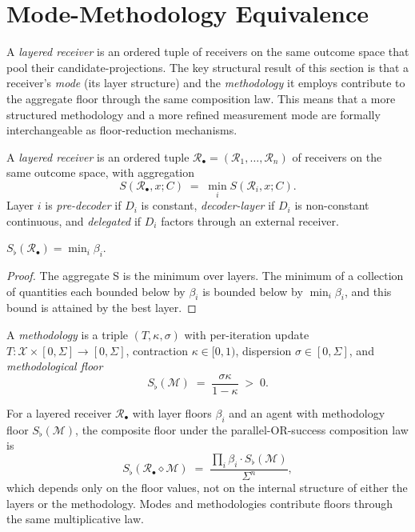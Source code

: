 \section{Mode-Methodology Equivalence}
\label{sec:mode-methodology}

A \emph{layered receiver} is an ordered tuple of receivers on the same
outcome space that pool their candidate-projections.  The key structural
result of this section is that a receiver's \emph{mode} (its layer
structure) and the \emph{methodology} it employs contribute to the
aggregate floor through the same composition law.  This means that a
more structured methodology and a more refined measurement mode are
formally interchangeable as floor-reduction mechanisms.

\begin{definition}
\label{def:layered-receiver}
A \emph{layered receiver} is an ordered tuple
$\mathcal{R}_\bullet = (\mathcal{R}_1, \ldots, \mathcal{R}_n)$ of receivers
on the same outcome space, with aggregation
\[
  S(\mathcal{R}_\bullet, x; C) \;=\; \min_{i} S(\mathcal{R}_i, x; C) .
\]
Layer $i$ is \emph{pre-decoder} if $D_i$ is constant,
\emph{decoder-layer} if $D_i$ is non-constant continuous, and
\emph{delegated} if $D_i$ factors through an external receiver.
\end{definition}

\begin{proposition}
\label{prop:layered-floor}
$S_\flat(\mathcal{R}_\bullet) = \min_i \beta_i$.
\end{proposition}

\begin{proof}
The aggregate S is the minimum over layers.  The minimum of a collection
of quantities each bounded below by $\beta_i$ is bounded below by
$\min_i \beta_i$, and this bound is attained by the best layer.
\end{proof}

\begin{definition}[Methodology]
\label{def:methodology}
A \emph{methodology} is a triple $(T, \kappa, \sigma)$ with per-iteration
update $T : \mathcal{X} \times [0, \Sigma] \to [0, \Sigma]$, contraction
$\kappa \in [0, 1)$, dispersion $\sigma \in [0, \Sigma]$, and
\emph{methodological floor}
\[
  S_\flat(\mathcal{M}) \;=\; \frac{\sigma \kappa}{1 - \kappa} \;>\; 0 .
\]
\end{definition}

\begin{theorem}
\label{thm:mode-method-equiv-ch01}
For a layered receiver $\mathcal{R}_\bullet$ with layer floors $\beta_i$
and an agent with methodology floor $S_\flat(\mathcal{M})$, the composite
floor under the parallel-OR-success composition law is
\[
  S_\flat(\mathcal{R}_\bullet \diamond \mathcal{M})
  \;=\; \frac{\prod_i \beta_i \cdot S_\flat(\mathcal{M})}{\Sigma^n} ,
\]
which depends only on the floor values, not on the internal structure of
either the layers or the methodology.  Modes and methodologies contribute
floors through the same multiplicative law.
\end{theorem}

